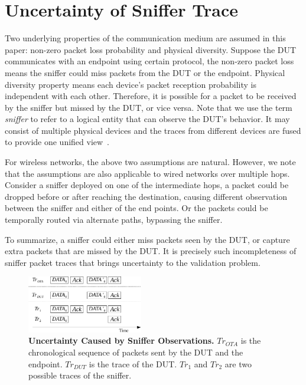 \section{Uncertainty of Sniffer Trace}
\label{sec:model}

Two underlying properties of the communication medium are assumed in this paper:
non-zero packet loss probability and physical diversity.
%
Suppose the DUT communicates with an endpoint using certain protocol, the
non-zero packet loss means the sniffer could miss packets from the DUT or the
endpoint.
%
Physical diversity property means each device's packet reception probability is
independent with each other.
%
Therefore, it is possible for a packet to be received by the sniffer but missed
by the DUT, or vice versa.
%
Note that we use the term \textit{sniffer} to refer to a logical entity that can
observe the DUT's behavior. It may consist of multiple physical devices and the
traces from different devices are fused to provide one unified
view~\cite{Cheng:2006:JSP:1159913.1159920,Mahajan:2006:AMB:1159913.1159923}.

For wireless networks, the above two assumptions are natural.
%
However, we note that the assumptions are also applicable to wired networks over
multiple hops.
%
Consider a sniffer deployed on one of the intermediate hops, a packet could be
dropped before or after reaching the destination, causing different observation
between the sniffer and either of the end points.
%
Or the packets could be temporally routed via alternate paths, bypassing the
sniffer. 

To summarize, a sniffer could either miss packets seen by the DUT, or capture
extra packets that are missed by the DUT. It is precisely such incompleteness of
sniffer packet traces that brings uncertainty to the validation problem.

\begin{figure}[t!]
  \centering
  \includegraphics[width=0.45\textwidth]{./figures/false_pos.pdf}
  \caption{\textbf{Uncertainty Caused by Sniffer Observations.} $Tr_{OTA}$ is
    the chronological sequence of packets sent by the DUT and the endpoint.
    $Tr_{DUT}$ is the trace of the DUT. $Tr_1$ and $Tr_2$ are two possible traces
  of the sniffer.}
  \label{fig:sniffer_in_middle}
\end{figure}

